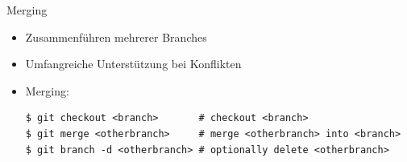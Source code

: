 \begin{frame}[fragile]{Merging}
  \begin{itemize}
    \item Zusammenführen mehrerer Branches
    \item Umfangreiche Unterstützung bei Konflikten
    \item Merging:
    \begin{lstlisting}
$ git checkout <branch>       # checkout <branch>
$ git merge <otherbranch>     # merge <otherbranch> into <branch>
$ git branch -d <otherbranch> # optionally delete <otherbranch>
    \end{lstlisting}
  \end{itemize}
\end{frame}



